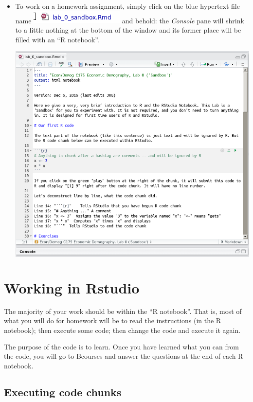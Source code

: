\documentclass[11pt]{article}
\begin{document}
\begin{itemize}
\item To work on a homework assignment, simply click on the blue hypertext file name
\includegraphics[scale=.5]{RstudioHyplink} and behold:  the \emph{Console} pane will shrink to a little nothing at the bottom of the window and its former place will be filled with an ``R notebook''.

\includegraphics[scale=.3]{RstudioRnotebook}


\end{itemize}

\section{Working in Rstudio}

The majority of your work should be within the ``R notebook''.  That is, most of what you will do for homework will be to read the instructions (in the R notebook); then execute some code; then change the code and execute it again.

The purpose of the code is to learn. Once you have learned what you can from the code, you will go to Bcourses and answer the questions at the end of each R notebook.   

\subsection{Executing code chunks}
\end{document}
